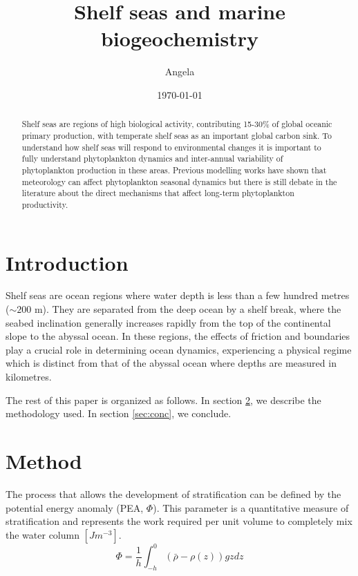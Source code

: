 \documentclass{article}
\title{Shelf seas and marine biogeochemistry}
\author{Angela}
\date{\today}
\begin{document}
\maketitle

\begin{abstract}
Shelf seas are regions of high biological activity, contributing 15-30\% of global oceanic primary production, with temperate shelf seas as an important global carbon sink. To understand how shelf seas will respond to environmental changes it is important to fully understand phytoplankton dynamics and inter-annual variability of phytoplankton production in these areas. Previous modelling works have shown that meteorology can affect phytoplankton seasonal dynamics but there is still debate in the literature about the direct mechanisms that affect long-term phytoplankton productivity. 
\end{abstract}

\section{Introduction}

Shelf seas are ocean regions where water depth is less than a few hundred metres ($\sim 200$ m). They are separated from the deep ocean by a shelf break, where the seabed inclination generally increases rapidly from the top of the continental slope to the abyssal ocean. In these regions, the effects of friction and boundaries play a crucial role in determining ocean dynamics, experiencing a
physical regime which is distinct from that of the abyssal ocean where depths are measured in kilometres. 

The rest of this paper is organized as follows. In section \ref{sec:method}, we
describe the methodology used. In section \ref{sec:conc}, we conclude.

\section{Method}
\label{sec:method}

The process that allows the development of stratification can be defined by the potential energy anomaly (PEA, $\Phi$). This parameter is a quantitative measure of stratification and represents the work required per unit volume to completely mix
the water column $[Jm^{-3}]$. \\

\begin{equation*}
     \Phi=\frac{1}{h}\int_{-h}^{0}(\bar{\rho}-\rho(z))gzdz 
\end{equation*}
\end{document}
